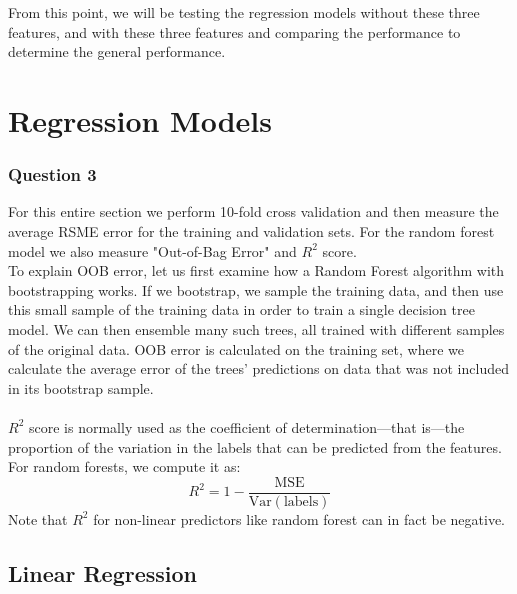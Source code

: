 \documentclass[11pt,letterpaper]{article}
\begin{document}
From this point, we will be testing the regression models without these three 
features, and with these three features and comparing the performance to 
determine the general performance.

\section*{Regression Models}
\subsubsection*{Question 3}
For this entire section we perform 10-fold cross validation and then measure
the average RSME error for the training and validation sets. For the random 
forest model we also measure "Out-of-Bag Error" and $R^2$ score. \\
To explain OOB error, let us first examine how a Random Forest algorithm with
bootstrapping works. If we bootstrap, we sample the training data, and then use 
this small sample of the training data in order to train a single decision tree model.
We can then ensemble many such trees, all trained with different samples of the original
data. OOB error is calculated on the training set, where we calculate the average error 
of the trees' predictions on data that was not included in its bootstrap sample. \\\\
$R^2$ score is normally used as the coefficient of determination—that is—the proportion
of the variation in the labels that can be predicted from the features. For random 
forests, we compute it as:
\[R^2 = 1- \dfrac{\text{MSE}}{\text{Var}(\text{labels})}
    \]
Note that $R^2$ for non-linear predictors like random forest can in fact be negative.

\subsection*{Linear Regression}
\end{document}

